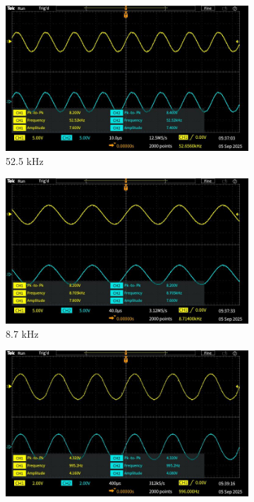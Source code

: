 \documentclass{article}
\begin{document}
\begin{figure}[H]
    \centering
    \begin{subfigure}[b]{0.45\textwidth}
        \includegraphics[width=\textwidth]{2.2.ca.png}
        \caption{52.5 kHz}
    \end{subfigure}
    \hfill
    \begin{subfigure}[b]{0.45\textwidth}
        \includegraphics[width=\textwidth]{2.2.cb.png}
        \caption{8.7 kHz}
    \end{subfigure}
    \begin{subfigure}[b]{0.45\textwidth}
        \includegraphics[width=\textwidth]{2.2.cc.png}

\end{subfigure}
\end{figure}
\end{document}

